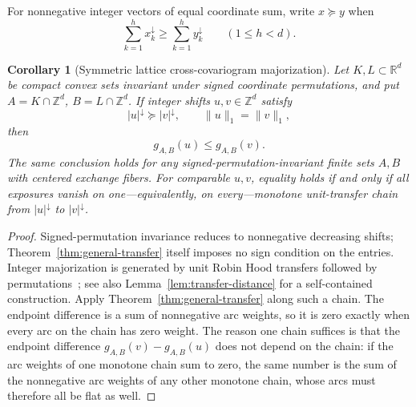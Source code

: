 \documentclass[pdflatex,sn-mathphys-num]{sn-jnl}
\theoremstyle{thmstyleone}
\newtheorem{corollary}[theorem]{Corollary}
\theoremstyle{thmstylethree}
\theoremstyle{thmstyletwo}
\newcommand{\Z}{\mathbb Z}
\newcommand{\R}{\mathbb R}
\begin{document}
For nonnegative integer vectors of equal coordinate sum, write $x\succeq y$
when
\[
 \sum_{k=1}^h x_k^\downarrow
 \ge\sum_{k=1}^h y_k^\downarrow\qquad(1\le h<d).
\]

\begin{corollary}[Symmetric lattice cross-covariogram majorization]
\label{cor:general-majorization}
Let $K,L\subset\R^d$ be compact convex sets invariant under signed coordinate
permutations, and put $A=K\cap\Z^d$, $B=L\cap\Z^d$.  If
integer shifts $u,v\in\Z^d$ satisfy
\begin{equation}
 |u|^\downarrow\succeq |v|^\downarrow,
 \qquad \|u\|_1=\|v\|_1,
 \label{eq:general-majorization}
\end{equation}
then
\begin{equation}
 g_{A,B}(u)\le g_{A,B}(v).                           \label{eq:general-schur}
\end{equation}
The same conclusion holds for any signed-permutation-invariant finite sets
$A,B$ with centered exchange fibers.  For comparable $u,v$, equality holds
if and only if all exposures vanish on one---equivalently, on every---monotone
unit-transfer chain from $|u|^\downarrow$ to $|v|^\downarrow$.
\end{corollary}

\begin{proof}
Signed-permutation invariance reduces to nonnegative decreasing shifts;
Theorem~\ref{thm:general-transfer} itself imposes no sign condition on the
entries.  Integer majorization is generated by unit Robin Hood transfers
followed by permutations~\cite{MarshallOlkinArnold11}; see also
Lemma~\ref{lem:transfer-distance} for a self-contained construction.  Apply
Theorem~\ref{thm:general-transfer} along such a chain.  The endpoint
difference is a sum of nonnegative arc weights, so it is zero exactly when
every arc on the chain has zero weight.  The reason one chain suffices is
that the endpoint difference $g_{A,B}(v)-g_{A,B}(u)$ does not depend on the
chain: if the arc weights of one monotone chain sum to zero, the same number
is the sum of the nonnegative arc weights of any other monotone chain, whose
arcs must therefore all be flat as well.
\end{proof}
\end{document}

